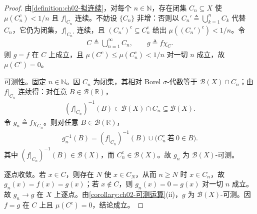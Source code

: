 \documentclass[../../main.tex]{subfiles}%
\begin{document}
\begin{proof}
由\cref{definition:ch02-拟连续}，对每个 $n\in\mathbb{N}$，存在闭集 $C_n\subseteq X$ 使 $\mu(C_n^c)<1/n$ 且 $f|_{C_n}$ 连续。不妨设 $\{C_n\}$ 非增：否则以 $C_n'\triangleq\bigcup_{k=1}^nC_k$ 代替 $C_n$，它仍为闭集，$f|_{C_n'}$ 连续，且 $(C_n')^c\subseteq C_n^c$ 给出 $\mu((C_n')^c)<1/n$。令
\begin{align*}
C\triangleq\bigcup_{n=1}^\infty C_n,\qquad g\triangleq f\chi_C.
\end{align*}
则 $g=f$ 在 $C$ 上成立，且 $\mu(C^c)\leqslant\mu(C_n^c)<1/n$ 对一切 $n$ 成立，故 $\mu(C^c)=0$。

可测性。固定 $n\in\mathbb{N}$。因 $C_n$ 为闭集，其相对 Borel $\sigma$-代数等于 $\mathscr B(X)\cap C_n$；由 $f|_{C_n}$ 连续得：对任意 $B\in\mathscr B(\mathbb{R})$，
\begin{align*}
(f|_{C_n})^{-1}(B)\in\mathscr B(X)\cap C_n\subseteq\mathscr B(X).
\end{align*}
令 $g_n\triangleq f\chi_{C_n}$。则对任意 $B\in\mathscr B(\mathbb{R})$，
\begin{align*}
g_n^{-1}(B)=(f|_{C_n})^{-1}(B)\cup\bigl(C_n^c\ \text{若}\ 0\in B\bigr).
\end{align*}
其中 $(f|_{C_n})^{-1}(B)\in\mathscr B(X)$，而 $C_n^c\in\mathscr B(X)$。故 $g_n$ 为 $\mathscr B(X)$-可测。

逐点收敛。若 $x\in C$，则存在 $N$ 使 $x\in C_N$，从而 $n\geqslant N$ 时 $x\in C_n$，故 $g_n(x)=f(x)=g(x)$；若 $x\notin C$，则 $g_n(x)=0=g(x)$ 对一切 $n$ 成立。故 $g_n\to g$ 在 $X$ 上逐点。由\cref{corollary:ch02-可测运算}(ii)，$g$ 为 $\mathscr B(X)$-可测。因 $f=g$ 在 $C$ 上且 $\mu(C^c)=0$，结论成立。
\end{proof}
\end{document}
